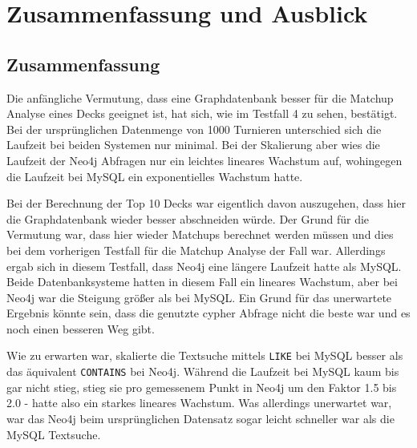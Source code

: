 \chapter{Zusammenfassung und Ausblick}\label{ch:conclusion}

\section{Zusammenfassung}
% 

Die anfängliche Vermutung, dass eine Graphdatenbank besser für die Matchup Analyse eines Decks geeignet ist, hat sich, wie im Testfall 4 zu sehen, bestätigt. Bei der ursprünglichen Datenmenge von 1000 Turnieren unterschied sich die Laufzeit bei beiden Systemen nur minimal. Bei der Skalierung aber wies die Laufzeit der Neo4j Abfragen nur ein leichtes lineares Wachstum auf, wohingegen die Laufzeit bei MySQL ein exponentielles Wachstum hatte.

Bei der Berechnung der Top 10 Decks war eigentlich davon auszugehen, dass hier die Graphdatenbank wieder besser abschneiden würde. Der Grund für die Vermutung war, dass hier wieder Matchups berechnet werden müssen und dies bei dem vorherigen Testfall für die Matchup Analyse der Fall war. Allerdings ergab sich in diesem Testfall, dass Neo4j eine längere Laufzeit hatte als MySQL. Beide Datenbanksysteme hatten in diesem Fall ein lineares Wachstum, aber bei Neo4j war die Steigung größer als bei MySQL. Ein Grund für das unerwartete Ergebnis könnte sein, dass die genutzte cypher Abfrage nicht die beste war und es noch einen besseren Weg gibt.

Wie zu erwarten war, skalierte die Textsuche mittels \verb|LIKE| bei MySQL besser als das äquivalent \verb|CONTAINS| bei Neo4j. Während die Laufzeit bei MySQL kaum bis gar nicht stieg, stieg sie pro gemessenem Punkt in Neo4j um den Faktor 1.5 bis 2.0 - hatte also ein starkes lineares Wachstum. Was allerdings unerwartet war, war das Neo4j beim ursprünglichen Datensatz sogar leicht schneller war als die MySQL Textsuche.

